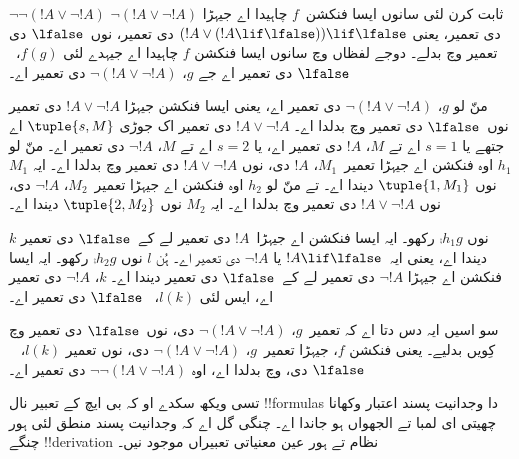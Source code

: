 \documentclass[../../../include/open-logic-section]{subfiles}
\begin{document}
\begin{ex}
$\lnot \lnot (!A \lor \lnot !A)$ ثابت کرن لئی سانوں ایسا فنکشن~$f$
چاہیدا اے جیہڑا $\lnot(!A \lor \lnot !A)$ دی تعمیر، یعنی $(!A
\lor (!A \lif \lfalse)) \lif \lfalse$ دی تعمیر، نوں~$\lfalse$
دی تعمیر وچ بدلے۔ دوجے لفظاں وچ سانوں ایسا فنکشن $f$ چاہیدا اے
جیہدے لئی $f(g)$،~$\lfalse$ دی تعمیر اے جے $g$،
$\lnot(!A \lor \lnot !A)$ دی تعمیر اے۔

منّ لو $g$، $\lnot(!A \lor \lnot !A)$ دی تعمیر اے، یعنی ایسا فنکشن
جیہڑا $!A \lor \lnot !A$ دی تعمیر نوں~$\lfalse$ دی تعمیر وچ
بدلدا اے۔ $!A \lor \lnot !A$ دی تعمیر اک جوڑی $\tuple{s, M}$ اے
جتھے یا $s = 1$ اے تے $M$، $!A$ دی تعمیر اے، یا $s = 2$ اے تے
$M$، $\lnot !A$ دی تعمیر اے۔ منّ لو $h_1$ اوہ فنکشن اے جیہڑا تعمیر~$M_1$،
$!A$ دی، نوں $!A \lor \lnot !A$ دی تعمیر وچ بدلدا اے۔ ایہ $M_1$ نوں
$\tuple{1, M_1}$ دیندا اے۔ تے منّ لو $h_2$ اوہ فنکشن اے جیہڑا
تعمیر~$M_2$، $\lnot !A$ دی، نوں $!A \lor \lnot !A$ دی تعمیر وچ
بدلدا اے۔ ایہ $M_2$ نوں $\tuple{2, M_2}$ دیندا اے۔

$k$ نوں $\comp{h_1}{g}$ رکھو۔ ایہ ایسا فنکشن اے جیہڑا~$!A$ دی
تعمیر لے کے~$\lfalse$ دی تعمیر دیندا اے، یعنی ایہ~$!A \lif \lfalse$
یا $\lnot !A$ دی تعمیر اے۔ ہُن $l$ نوں $\comp{h_2}{g}$ رکھو۔
ایہ ایسا فنکشن اے جیہڑا $\lnot !A$ دی تعمیر لے کے~$\lfalse$ دی
تعمیر دیندا اے۔ $k$، $\lnot !A$ دی تعمیر اے، ایس لئی $l(k)$،
~$\lfalse$ دی تعمیر اے۔

سو اسیں ایہ دس دتا اے کہ تعمیر~$g$، $\lnot(!A \lor \lnot !A)$
دی، نوں~$\lfalse$ دی تعمیر وچ کِویں بدلیے۔ یعنی فنکشن $f$، جیہڑا
تعمیر~$g$، $\lnot(!A \lor \lnot !A)$ دی، نوں تعمیر $l(k)$،
~$\lfalse$ دی، وچ بدلدا اے، اوہ $\lnot\lnot(!A \lor \lnot !A)$
دی تعمیر اے۔
\end{ex}

تسی ویکھ سکدے او کہ بی ایچ کے تعبیر نال !!{formula}s دا وجدانیت
پسند اعتبار وکھانا چھیتی ای لمبا تے الجھواں ہو جاندا اے۔ چنگی گل اے
کہ وجدانیت پسند منطق لئی ہور چنگے !!{derivation} نظام تے ہور عین
معنیاتی تعبیراں موجود نیں۔
\end{document}
